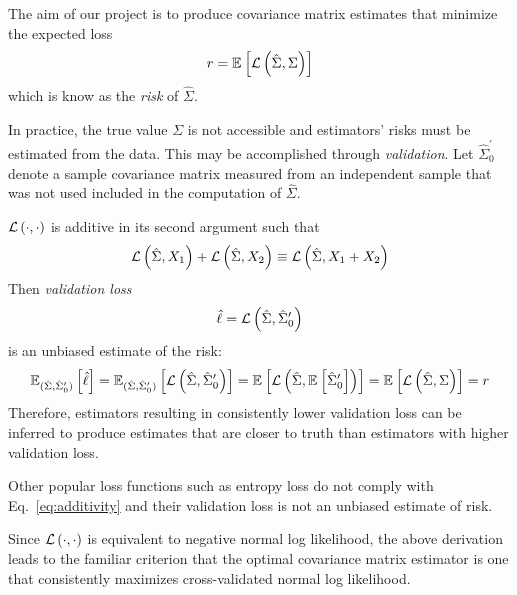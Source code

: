 The aim of our project is to produce covariance matrix estimates that minimize the expected loss 
\begin{equation}
r = \E{\loss{\hat\Sigma, \Sigma}}
\end{equation}
which is know as the \emph{risk} of $\hat\Sigma$.

In practice, the true value $\Sigma$ is not accessible and estimators' risks must be estimated from the data.  This may be accomplished through \emph{validation}. 
Let $\hat\Sigma_0^\prime$ denote a sample covariance matrix measured from an independent sample that was not used included in the computation of $\hat\Sigma$. 

$\loss{\cdot,\cdot}$ is additive in its second argument such that
 \begin{equation}\label{eq:additivity}
 \loss{\hat\Sigma,X_1} + \loss{\hat\Sigma,X_2} \equiv \loss{\hat\Sigma,X_1+X_2}
 \end{equation}
Then \emph{validation loss}  
\begin{equation}
\hat \ell = \loss{\hat\Sigma,\hat\Sigma_0^\prime}
\end{equation}
is an unbiased estimate of the risk:
 \begin{equation}\label{eq:empiricalRisk}
\E[(\hat\Sigma, \hat\Sigma_0^\prime)] {\hat\ell} 
= \E[(\hat\Sigma, \hat\Sigma_0^\prime)]{\loss{\hat\Sigma,\hat\Sigma_0^\prime}}
= \E{\loss{\hat\Sigma,\E{\hat\Sigma_0^\prime}}}
= \E{\loss{\hat\Sigma,\Sigma}} = r
 \end{equation}
Therefore, estimators resulting in consistently lower validation loss can be inferred to produce estimates that are closer to truth than estimators with higher validation loss.

Other popular loss functions such as entropy loss do not comply with Eq.~\ref{eq:additivity} and their validation loss is not an unbiased estimate of risk.

Since $\loss{\cdot,\cdot}$ is equivalent to negative normal log likelihood, the above derivation leads to the familiar criterion that the optimal covariance matrix estimator is one that consistently maximizes cross-validated normal log likelihood.